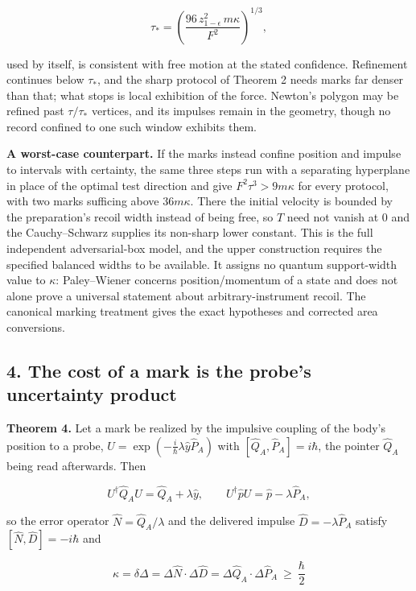 \documentclass[11pt,a4paper]{article}
\begin{document}
\[\tau_*=\left(\frac{96\,z_{1-\epsilon}^2\,m\kappa}{F^2}\right)^{1/3},\]

used by itself, is consistent with free motion at the stated confidence.
Refinement continues below \(\tau_*\), and the sharp protocol of Theorem
2 needs marks far denser than that; what stops is local exhibition of
the force. Newton's polygon may be refined past \(\tau/\tau_*\)
vertices, and its impulses remain in the geometry, though no record
confined to one such window exhibits them.

\textbf{A worst-case counterpart.} If the marks instead confine position
and impulse to intervals with certainty, the same three steps run with a
separating hyperplane in place of the optimal test direction and give
\(F^2\tau^3>9m\kappa\) for every protocol, with two marks sufficing
above \(36m\kappa\). There the initial velocity is bounded by the
preparation's recoil width instead of being free, so \(T\) need not
vanish at \(0\) and the Cauchy--Schwarz supplies its non-sharp lower
constant. This is the full independent adversarial-box model, and the
upper construction requires the specified balanced widths to be
available. It assigns no quantum support-width value to \(\kappa\):
Paley--Wiener concerns position/momentum of a state and does not alone
prove a universal statement about arbitrary-instrument recoil. The
canonical marking treatment gives the exact hypotheses and corrected
area conversions.

\hypertarget{the-cost-of-a-mark-is-the-probes-uncertainty-product}{%
\subsection{4. The cost of a mark is the probe's uncertainty
product}\label{the-cost-of-a-mark-is-the-probes-uncertainty-product}}

\textbf{Theorem 4.} Let a mark be realized by the impulsive coupling of
the body's position to a probe,
\(U=\exp(-\tfrac{i}{\hbar}\lambda\hat y\hat P_A)\) with
\([\hat Q_A,\hat P_A]=i\hbar\), the pointer \(\hat Q_A\) being read
afterwards. Then

\[U^\dagger\hat Q_AU=\hat Q_A+\lambda\hat y,\qquad
U^\dagger\hat pU=\hat p-\lambda\hat P_A,\]

so the error operator \(\hat N=\hat Q_A/\lambda\) and the delivered
impulse \(\hat D=-\lambda\hat P_A\) satisfy \([\hat N,\hat D]=-i\hbar\)
and

\[\kappa=\delta\Delta=\Delta\hat N\cdot\Delta\hat D
=\Delta\hat Q_A\cdot\Delta\hat P_A\ \ge\ \frac\hbar2\]
\end{document}
